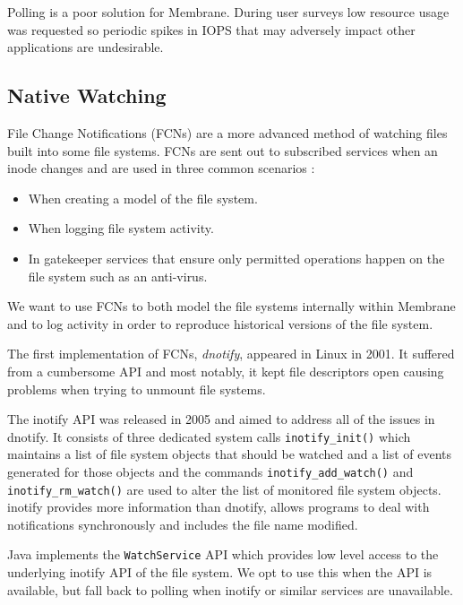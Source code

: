 \documentclass[11pt, a4paper, twoside]{report}
\def\code#1{\texttt{#1}}
\begin{document}
Polling is a poor solution for Membrane. During user surveys low resource usage was requested so periodic spikes in IOPS that may adversely impact other applications are undesirable.

\subsection{Native Watching}

File Change Notifications (FCNs) are a more advanced method of watching files built into some file systems. FCNs are sent out to subscribed services when an inode changes and are used in three common scenarios \citep{kerrisk2014fcn}:

\begin{itemize}
 \item When creating a model of the file system.
 \item When logging file system activity.
 \item In gatekeeper services that ensure only permitted operations happen on the file system such as an anti-virus.
\end{itemize}

We want to use FCNs to both model the file systems internally within Membrane and to log activity in order to reproduce historical versions of the file system.

The first implementation of FCNs, \emph{dnotify}, appeared in Linux in 2001. It suffered from a cumbersome API and most notably, it kept file descriptors open causing problems when trying to unmount file systems. \citep{kerrisk2014fcn}

The inotify API was released in 2005 and aimed to address all of the issues in dnotify. It consists of three dedicated system calls \code{inotify\_init()} which maintains a list of file system objects that should be watched and a list of events generated for those objects and the commands \code{inotify\_add\_watch()} and \code{inotify\_rm\_watch()} are used to alter the list of monitored file system objects. inotify provides more information than dnotify, allows programs to deal with notifications synchronously and includes the file name modified. \citep{kerrisk2014fcn}

Java implements the \code{WatchService} API which provides low level access to the underlying inotify API of the file system. \citep{oracle2017dir} We opt to use this when the API is available, but fall back to polling when inotify or similar services are unavailable.
\end{document}
